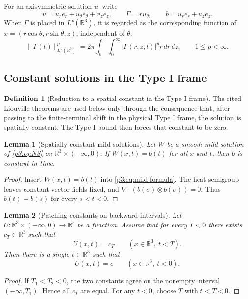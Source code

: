 \documentclass[11pt]{amsart}
\theoremstyle{plain}
\newtheorem{lemma}[lemma]{Lemma}
\theoremstyle{definition}
\newtheorem{definition}[definition]{Definition}
\theoremstyle{remark}
\numberwithin{equation}{section}
\begin{document}
For an axisymmetric solution \(u\), write
\[
   u=u_re_r+u_\theta e_\theta+u_ze_z,\qquad
   \Gamma=ru_\theta,\qquad
   b=u_re_r+u_ze_z .
\]
When \(\Gamma\) is placed in \(L^p(\mathbb R^3)\), it is regarded as the
corresponding function of \(x=(r\cos\theta,r\sin\theta,z)\), independent of
\(\theta\):
\[
   \|\Gamma(t)\|_{L^p(\mathbb R^3)}^p
   =
   2\pi\int_{\mathbb R}\int_0^\infty
      |\Gamma(r,z,t)|^p r\,dr\,dz,\qquad 1\le p<\infty .
\]

\subsection{Constant solutions in the Type I frame}

\begin{definition}[Reduction to a spatial constant in the Type I frame]
The cited Liouville theorems are used below only through the consequence that,
after passing to the finite-terminal shift in the physical Type I frame, the
solution is spatially constant.  The Type I bound then forces that constant to
be zero.
\end{definition}

\begin{lemma}[Spatially constant mild solutions]\label{p3:lem:spatial-constant-mild}
Let \(W\) be a smooth mild solution of \eqref{p3:eq:NS} on
\(\mathbb R^3\times(-\infty,0)\).  If \(W(x,t)=b(t)\) for all \(x\) and \(t\),
then \(b\) is constant in time.
\end{lemma}

\begin{proof}
Insert \(W(x,t)=b(t)\) into \eqref{p3:eq:mild-formula}.  The heat semigroup
leaves constant vector fields fixed, and
\(\nabla\cdot(b(\sigma)\otimes b(\sigma))=0\).  Thus
\(b(t)=b(s)\) for every \(s<t<0\).
\end{proof}

\begin{lemma}[Patching constants on backward intervals]
\label{p3:lem:patch-constants}
Let \(U:\mathbb R^3\times(-\infty,0)\to\mathbb R^3\) be a function.  Assume
that for every \(T<0\) there exists \(c_T\in\mathbb R^3\) such that
\[
   U(x,t)=c_T\qquad(x\in\mathbb R^3,\ t<T).
\]
Then there is a single \(c\in\mathbb R^3\) such that
\[
   U(x,t)=c\qquad(x\in\mathbb R^3,\ t<0).
\]
\end{lemma}

\begin{proof}
If \(T_1<T_2<0\), the two constants agree on the nonempty interval
\((-\infty,T_1)\).  Hence all \(c_T\) are equal.  For any \(t<0\), choose
\(T\) with \(t<T<0\).
\end{proof}
\end{document}
